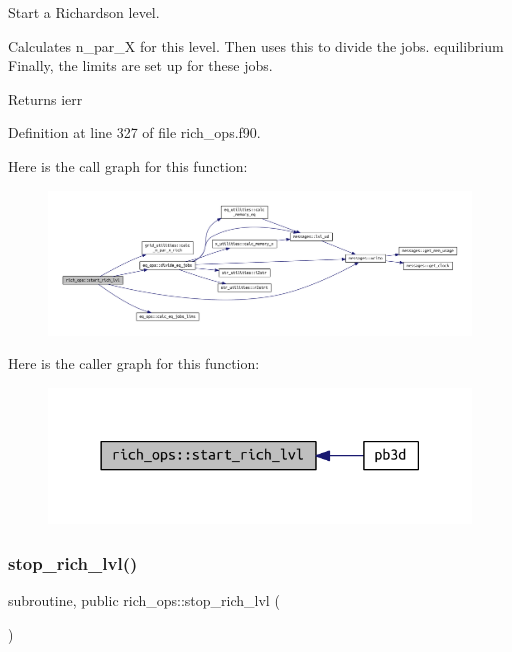 Start a Richardson level. 

Calculates {\ttfamily n\+\_\+par\+\_\+X} for this level. Then uses this to divide the jobs. equilibrium Finally, the limits are set up for these jobs.

\begin{DoxyReturn}{Returns}
ierr 
\end{DoxyReturn}


Definition at line 327 of file rich\+\_\+ops.\+f90.

Here is the call graph for this function\+:\nopagebreak
\begin{figure}[H]
\begin{center}
\leavevmode
\includegraphics[width=350pt]{namespacerich__ops_a97206a15127960366fcb41d6889cb3b5_cgraph}
\end{center}
\end{figure}
Here is the caller graph for this function\+:\nopagebreak
\begin{figure}[H]
\begin{center}
\leavevmode
\includegraphics[width=318pt]{namespacerich__ops_a97206a15127960366fcb41d6889cb3b5_icgraph}
\end{center}
\end{figure}
\mbox{\label{namespacerich__ops_a0cce16b835e18b025d366a038b22efe1}} 
\subsubsection{\texorpdfstring{stop\+\_\+rich\+\_\+lvl()}{stop\_rich\_lvl()}}
{\footnotesize\ttfamily subroutine, public rich\+\_\+ops\+::stop\+\_\+rich\+\_\+lvl (\begin{DoxyParamCaption}{ }\end{DoxyParamCaption})}




